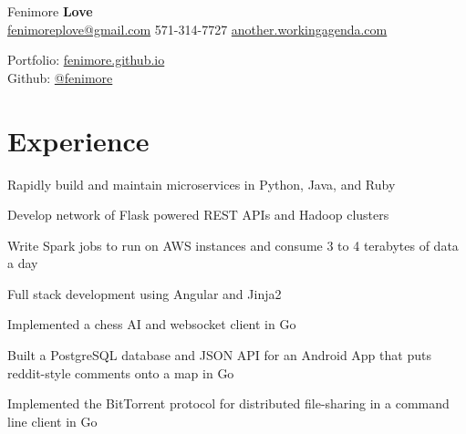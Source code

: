 \documentclass[]{deedy-resume-openfont}
\begin{document}
%
%

%
%
\hspace{-5.5mm}
\begin{minipage}[t]{.6\textwidth}
{\Huge Fenimore {\textbf{Love}}}\\
\href{mailto:fenimoreplove@gmail.com}{fenimoreplove@gmail.com} \textbullet{} 571-314-7727 \textbullet{} \href{http://another.workingagenda.com}{another.workingagenda.com}\\
\end{minipage}
\hfill
\begin{minipage}[t]{.3\textwidth}
Portfolio: \href{https://fenimore.github.io}{fenimore.github.io}\\
Github: \href{https://github.com/fenimore}{@fenimore}
\end{minipage}
\namesection{}{} %


\section{Experience}
\begin{tightemize}
\item Rapidly build and maintain microservices in Python, Java, and Ruby
\item Develop network of Flask powered REST APIs and Hadoop clusters
\item Write Spark jobs to run on AWS instances and consume 3 to 4 terabytes of data a day
\item Full stack development using Angular and Jinja2
\end{tightemize}
\sectionsep

\begin{tightemize}
\item Implemented a chess AI and websocket client in Go
\item Built a PostgreSQL database and JSON API for an Android App that puts reddit-style comments onto a map in Go
\item Implemented the BitTorrent protocol for distributed file-sharing in a command line client in Go
\end{tightemize}
\sectionsep
\end{document}
